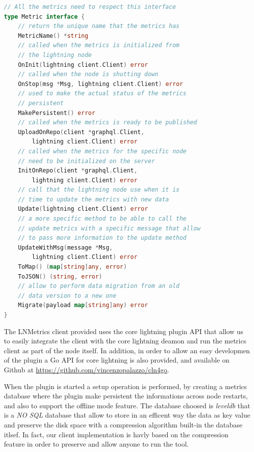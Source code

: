 \begin{lstlisting}[language=go, basicstyle=\small,
                  caption={Metric interface provided in our client reference implementation.}, 
                  label={code:lnmetric_client_inter}]
// All the metrics need to respect this interface
type Metric interface {
    // return the unique name that the metrics has
    MetricName() *string
    // called when the metrics is initialized from 
    // the lightning node
    OnInit(lightning client.Client) error
    // called when the node is shutting down
    OnStop(msg *Msg, lightning client.Client) error
    // used to make the actual status of the metrics
    // persistent
    MakePersistent() error
    // called when the metrics is ready to be published
    UploadOnRepo(client *graphql.Client, 
        lightning client.Client) error
    // called when the metrics for the specific node 
    // need to be initialized on the server
    InitOnRepo(client *graphql.Client, 
        lightning client.Client) error
    // call that the lightning node use when it is 
    // time to update the metrics with new data
    Update(lightning client.Client) error
    // a more specific method to be able to call the 
    // update metrics with a specific message that allow 
    // to pass more information to the update method
    UpdateWithMsg(message *Msg, 
        lightning client.Client) error
    ToMap() (map[string]any, error)
    ToJSON() (string, error)
    // allow to perform data migration from an old 
    // data version to a new one
    Migrate(payload map[string]any) error
}
\end{lstlisting}

The LNMetrics client provided uses the core lightning plugin API
that allow us to easily integrate the client with the core lightning deamon 
and run the metrics client as part of the node itself. 
In addition, in order to allow an easy developmen of the plugin a 
Go API for core lightning is also provided, and available on 
Github at \url{https://github.com/vincenzopalazzo/cln4go}.

When the plugin is started a setup operation is performed, by creating a 
metrics database where the plugin make persistent the informations 
across node restarts, and also to support the offline mode feature. 
The database choosed is \emph{leveldb} that is a \emph{NO SQL} database 
that allow to store in an efficent way the data as key value and preserve
the disk space with a compression algorithm built-in the database itlsef.
In fact, our client implementation is havly based on the 
compression feature in order to preserve and allow anyone to 
run the tool. 

